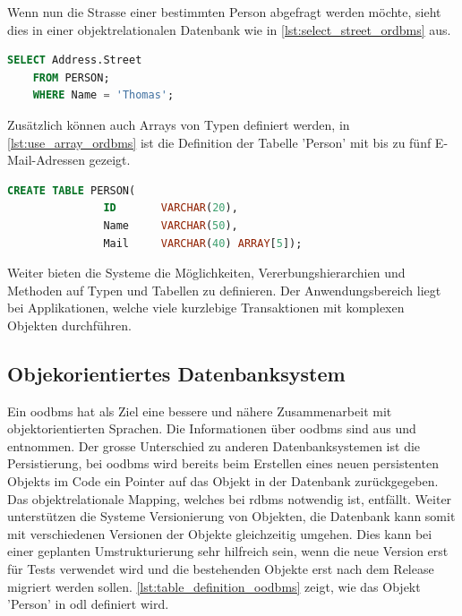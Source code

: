 Wenn nun die Strasse einer bestimmten Person abgefragt werden möchte, sieht dies in einer objektrelationalen Datenbank wie in \autoref{lst:select_street_ordbms} aus.

\begin{lstlisting}[language=SQL, caption=Abfrage in objektrelationalem Datenbanksystem, label=lst:select_street_ordbms]  
    SELECT Address.Street
    FROM PERSON;
    WHERE Name = 'Thomas';
\end{lstlisting}

Zusätzlich können auch Arrays von Typen definiert werden, in \autoref{lst:use_array_ordbms} ist die Definition der Tabelle 'Person' mit 
bis zu fünf E-Mail-Adressen gezeigt.

\begin{lstlisting}[language=SQL, caption=Verwendung von Array in objektrelationalem Datenbanksystem, label=lst:use_array_ordbms]  
    CREATE TABLE PERSON(
               ID       VARCHAR(20),
               Name     VARCHAR(50),
               Mail     VARCHAR(40) ARRAY[5]);
\end{lstlisting}

Weiter bieten die Systeme die Möglichkeiten, Vererbungshierarchien und Methoden auf Typen und Tabellen zu definieren. Der Anwendungsbereich 
liegt bei Applikationen, welche viele kurzlebige Transaktionen mit komplexen Objekten durchführen.

\subsection{Objekorientiertes Datenbanksystem}\label{object_db}
Ein \gls{oodbms} hat als Ziel eine bessere und nähere Zusammenarbeit mit objektorientierten Sprachen. 
Die Informationen über \gls{oodbms} sind aus \cite{limited2010introduction} und \cite{oodbms_details} entnommen. Der grosse Unterschied zu anderen Datenbanksystemen
ist die Persistierung, bei \gls{oodbms} wird bereits beim Erstellen eines neuen persistenten Objekts im Code ein Pointer auf das Objekt in der Datenbank zurückgegeben. 
Das objektrelationale Mapping, welches bei \gls{rdbms} notwendig ist, entfällt. 
Weiter unterstützen die Systeme Versionierung von Objekten, die Datenbank kann somit mit verschiedenen Versionen der Objekte gleichzeitig umgehen. 
Dies kann bei einer geplanten Umstrukturierung sehr hilfreich sein, wenn die neue Version erst für Tests verwendet wird und die bestehenden Objekte erst nach dem 
Release migriert werden sollen. \autoref{lst:table_definition_oodbms} zeigt, wie das Objekt 'Person' in \gls{odl} definiert wird.

